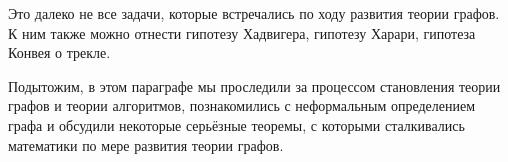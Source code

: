 	Это далеко не все задачи, которые встречались по ходу развития теории графов. 
	К ним также можно отнести гипотезу Хадвигера, гипотезу Харари, гипотеза Конвея о трекле.
	
	Подытожим, в этом параграфе мы проследили за процессом становления теории графов и теории алгоритмов, познакомились с 
	неформальным определением графа и обсудили некоторые серьёзные теоремы, с которыми сталкивались математики по мере развития теории графов.